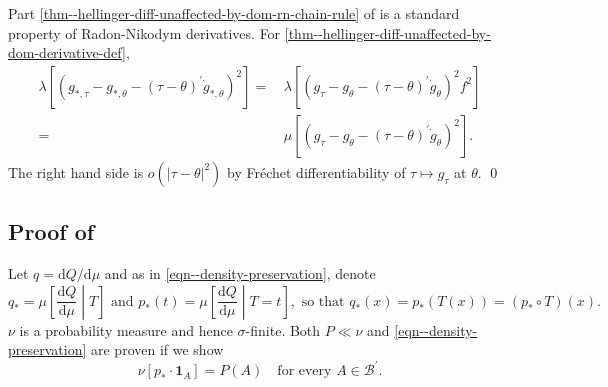 Part \ref{thm--hellinger-diff-unaffected-by-dom-rn-chain-rule} of
 is a standard property of
Radon-Nikodym derivatives.
For \ref{thm--hellinger-diff-unaffected-by-dom-derivative-def},
\begin{equation*}
  \begin{split}
  \lambda \left[ \left( g_{\ast, \tau} - g_{\ast, \theta} -
  \left( \tau - \theta \right)^{\prime} \dot{g}_{\ast, \theta}
  \right)^{2} \right] =
  & \,
  \lambda \left[ \left( g_{\tau} - g_{\theta} - \left( \tau - \theta
  \right)^{\prime} \dot{g}_{\theta} \right)^{2} f^{2} \right] \\
  =
  & \,
  \mu \left[ \left( g_{\tau} - g_{\theta} - \left( \tau - \theta
  \right)^{\prime} \dot{g}_{\theta} \right)^{2} \right].
  \end{split}
\end{equation*}
The right hand side is \(o \left( \left| \tau - \theta \right|^{2} \right)\) by
Fr\'echet differentiability of \(\tau \mapsto g_{\tau}\) at \(\theta\).
\qed

\subsection{Proof of
\texorpdfstring{}{Theorem
\ref{thm--density-preservation}}}
\label{sec--prf--thm--density-preservation}

Let \(q = \mathrm{d} Q / \mathrm{d} \mu\) and as in
\eqref{eqn--density-preservation}, denote
\begin{equation}
  q_{\ast} = \mu \left[ \frac{\mathrm{d} Q}{\mathrm{d} \mu} \middle| T \right]
  \text{ and } p_{\ast} (t) = \mu \left[ \frac{\mathrm{d}
  Q}{\mathrm{d} \mu} \middle| T = t \right], \text{ so that } q_{\ast} (x) =
  p_{\ast} (T (x)) = \left( p_{\ast} \circ T \right) (x).
  \label{eqn--density-preservation-1}
\end{equation}
\(\nu\) is a probability measure and hence \(\sigma\)-finite.
Both \(P \ll \nu\) and \eqref{eqn--density-preservation} are proven if we show
\begin{equation}
  \nu \left[ p_{\ast} \cdot \mathbf{1}_{A} \right] = P (A) \quad \text{for
  every } A \in \mathcal{B}^{\prime}.
  \label{eqn--density-preservation-2}
\end{equation}

